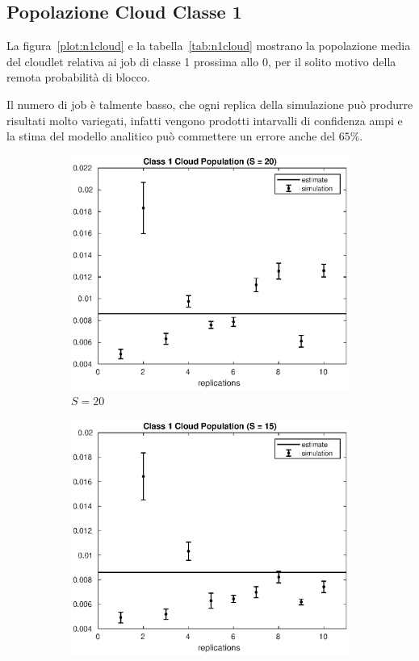 \subsection{Popolazione Cloud Classe 1}
La figura~\ref{plot:n1cloud} e la tabella~\ref{tab:n1cloud} mostrano la
popolazione media del cloudlet relativa ai job di classe 1 prossima allo 0, per
il solito motivo della remota probabilità di blocco.

Il numero di job è talmente basso, che ogni replica della simulazione può
produrre risultati molto variegati, infatti vengono prodotti intarvalli di
confidenza ampi e la stima del modello analitico può commettere un errore anche
del $65\%$.
\begin{figure}[!h]
\centering
%
\begin{subfigure}[t]{0.49\textwidth}
\includegraphics[width=\textwidth]{figures/simul/20_500K_n1cloud}
\caption{$S = 20$}
\label{20_n1cloud}
\end{subfigure}
%
\begin{subfigure}[t]{0.49\textwidth}
\includegraphics[width=\textwidth]{figures/simul/15_500K_n1cloud}

\end{subfigure}
\end{figure}
